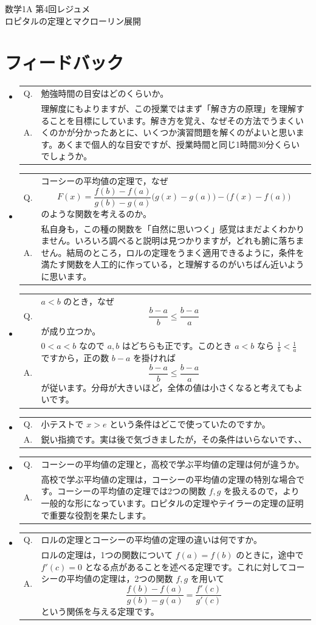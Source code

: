 \documentclass[a4paper,12pt]{jsarticle}
\makeatletter
\newcommand{\feedbackqa}[2]{%
\item[]
\begin{tabular}[t]{@{}p{1.8em}@{\hspace{0.4em}}p{\dimexpr\linewidth-2.2em\relax}@{}}
Q. & #1 \\
A. & #2
\end{tabular}
\par\smallskip\hrulefill
}
\theoremstyle{definition}
\makeatother
\begin{document}
\begin{center}
{\LARGE 数学1A 第4回レジュメ}\\[0.4em]
ロピタルの定理とマクローリン展開
\end{center}

\section*{フィードバック}

\begin{itemize}[leftmargin=1.5em,itemsep=0.7em,topsep=0.3em]
\feedbackqa{勉強時間の目安はどのくらいか。}{理解度にもよりますが、この授業ではまず「解き方の原理」を理解することを目標にしています。解き方を覚え、なぜその方法でうまくいくのかが分かったあとに、いくつか演習問題を解くのがよいと思います。あくまで個人的な目安ですが、授業時間と同じ1時間30分くらいでしょうか。}

\feedbackqa{コーシーの平均値の定理で，なぜ
\[
F(x)=\frac{f(b)-f(a)}{g(b)-g(a)}\bigl(g(x)-g(a)\bigr)-\bigl(f(x)-f(a)\bigr)
\]
のような関数を考えるのか。}{私自身も，この種の関数を「自然に思いつく」感覚はまだよくわかりません。いろいろ調べると説明は見つかりますが，どれも腑に落ちません。結局のところ，ロルの定理をうまく適用できるように，条件を満たす関数を人工的に作っている，と理解するのがいちばん近いように思います。}

\feedbackqa{$a<b$ のとき，なぜ
\[
\frac{b-a}{b}\leq \frac{b-a}{a}
\]
が成り立つか。}{$0<a<b$ なので $a,b$ はどちらも正です。このとき $a<b$ なら $\frac1b<\frac1a$ ですから，正の数 $b-a$ を掛ければ
\[
\frac{b-a}{b}\leq \frac{b-a}{a}
\]
が従います。分母が大きいほど，全体の値は小さくなると考えてもよいです。}

\feedbackqa{小テストで $x>e$ という条件はどこで使っていたのですか。}{鋭い指摘です。実は後で気づきましたが，その条件はいらないです、、}

\feedbackqa{コーシーの平均値の定理と，高校で学ぶ平均値の定理は何が違うか。}{高校で学ぶ平均値の定理は，コーシーの平均値の定理の特別な場合です。コーシーの平均値の定理では2つの関数 $f,g$ を扱えるので，より一般的な形になっています。ロピタルの定理やテイラーの定理の証明で重要な役割を果たします。}

\feedbackqa{ロルの定理とコーシーの平均値の定理の違いは何ですか。}{ロルの定理は，1つの関数について $f(a)=f(b)$ のときに，途中で $f'(c)=0$ となる点があることを述べる定理です。これに対してコーシーの平均値の定理は，2つの関数 $f,g$ を用いて
\[
\frac{f(b)-f(a)}{g(b)-g(a)}=\frac{f'(c)}{g'(c)}
\]
という関係を与える定理です。}


\end{itemize}
\end{document}
